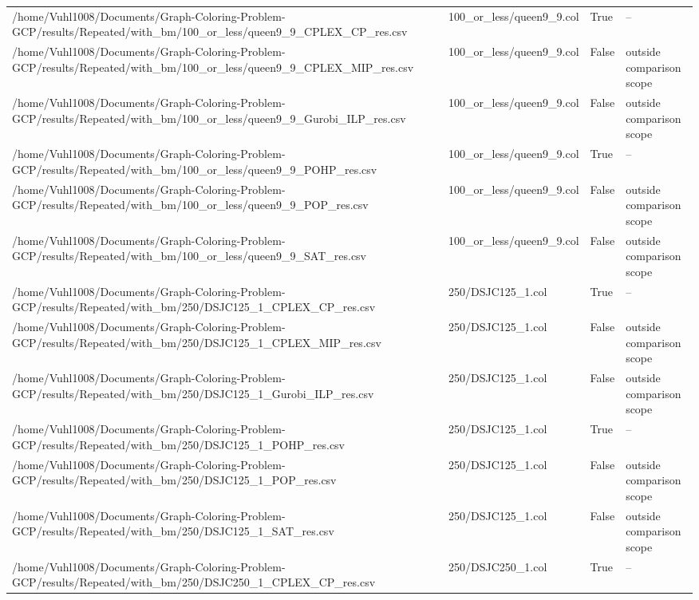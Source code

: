 \begin{table}[htbp]
\begin{tabular}{llll}
/home/Vuhl1008/Documents/Graph-Coloring-Problem-GCP/results/Repeated/with\_bm/100\_or\_less/queen9\_9\_CPLEX\_CP\_res.csv & 100\_or\_less/queen9\_9.col & True & -- \\
/home/Vuhl1008/Documents/Graph-Coloring-Problem-GCP/results/Repeated/with\_bm/100\_or\_less/queen9\_9\_CPLEX\_MIP\_res.csv & 100\_or\_less/queen9\_9.col & False & outside comparison scope \\
/home/Vuhl1008/Documents/Graph-Coloring-Problem-GCP/results/Repeated/with\_bm/100\_or\_less/queen9\_9\_Gurobi\_ILP\_res.csv & 100\_or\_less/queen9\_9.col & False & outside comparison scope \\
/home/Vuhl1008/Documents/Graph-Coloring-Problem-GCP/results/Repeated/with\_bm/100\_or\_less/queen9\_9\_POHP\_res.csv & 100\_or\_less/queen9\_9.col & True & -- \\
/home/Vuhl1008/Documents/Graph-Coloring-Problem-GCP/results/Repeated/with\_bm/100\_or\_less/queen9\_9\_POP\_res.csv & 100\_or\_less/queen9\_9.col & False & outside comparison scope \\
/home/Vuhl1008/Documents/Graph-Coloring-Problem-GCP/results/Repeated/with\_bm/100\_or\_less/queen9\_9\_SAT\_res.csv & 100\_or\_less/queen9\_9.col & False & outside comparison scope \\
/home/Vuhl1008/Documents/Graph-Coloring-Problem-GCP/results/Repeated/with\_bm/250/DSJC125\_1\_CPLEX\_CP\_res.csv & 250/DSJC125\_1.col & True & -- \\
/home/Vuhl1008/Documents/Graph-Coloring-Problem-GCP/results/Repeated/with\_bm/250/DSJC125\_1\_CPLEX\_MIP\_res.csv & 250/DSJC125\_1.col & False & outside comparison scope \\
/home/Vuhl1008/Documents/Graph-Coloring-Problem-GCP/results/Repeated/with\_bm/250/DSJC125\_1\_Gurobi\_ILP\_res.csv & 250/DSJC125\_1.col & False & outside comparison scope \\
/home/Vuhl1008/Documents/Graph-Coloring-Problem-GCP/results/Repeated/with\_bm/250/DSJC125\_1\_POHP\_res.csv & 250/DSJC125\_1.col & True & -- \\
/home/Vuhl1008/Documents/Graph-Coloring-Problem-GCP/results/Repeated/with\_bm/250/DSJC125\_1\_POP\_res.csv & 250/DSJC125\_1.col & False & outside comparison scope \\
/home/Vuhl1008/Documents/Graph-Coloring-Problem-GCP/results/Repeated/with\_bm/250/DSJC125\_1\_SAT\_res.csv & 250/DSJC125\_1.col & False & outside comparison scope \\
/home/Vuhl1008/Documents/Graph-Coloring-Problem-GCP/results/Repeated/with\_bm/250/DSJC250\_1\_CPLEX\_CP\_res.csv & 250/DSJC250\_1.col & True & -- \\

\end{tabular}
\end{table}
